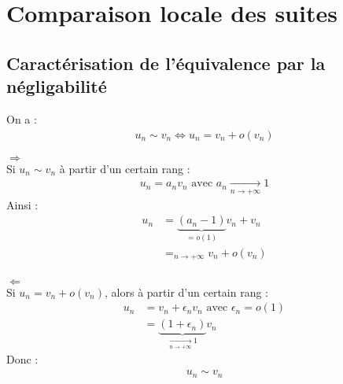 \documentclass[../main.tex]{subfiles}
\begin{document}
\setcounter{chapter}{23}
\chapter{Comparaison locale des suites}
\tableofcontents
\clearpage

\section{Caractérisation de l'équivalence par la négligabilité}
\begin{tcolorbox}[title=Propostion 24.18, title filled=false, colframe=lightblue, colback=lightblue!10!white]
    On a : 
    \begin{align*}
        u_n \sim v_n \Leftrightarrow u_n = v_n + o(v_n)
    \end{align*}
\end{tcolorbox}

$\boxed{\Rightarrow}$ \\
Si $u_n \sim v_n$ à partir d'un certain rang : 
\begin{align*}
    u_n = a_n v_n \text{ avec } a_n \underset{n \to +\infty}{\longrightarrow} 1
\end{align*}
Ainsi : 
\begin{align*}
    u_n &= \underbrace{(a_n - 1)}_{= o(1)} v_n + v_n \\
    &=_{n\to +\infty} v_n + o(v_n)
\end{align*} \\

$\boxed{\Leftarrow}$ \\
Si $u_n = v_n + o(v_n)$, alors à partir d'un certain rang :
\begin{align*}
    u_n &= v_n + \epsilon_n v_n \text{ avec } \epsilon_n = o(1) \\
    &= \underbrace{(1 + \epsilon_n)}_{\underset{n \to +\infty}{\longrightarrow} 1} v_n
\end{align*}
Donc : 
\begin{align*}
    u_n \sim v_n
\end{align*}
\end{document}
